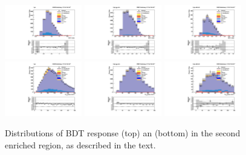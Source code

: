 \begin{figure}[!htpb]\centering
 \captionsetup{justification=centering}
 \includegraphics[width=0.30\textwidth]{plots_and_figures/chapter6/tt_cr_cutbased/1_preselection_BDT_value.pdf}
 \includegraphics[width=0.30\textwidth]{plots_and_figures/chapter6/tt_cr_cutbased/21_preselection_BDT_value.pdf} 
 \includegraphics[width=0.30\textwidth]{plots_and_figures/chapter6/tt_cr_cutbased/22_preselection_BDT_value.pdf} \\
 \includegraphics[width=0.30\textwidth]{plots_and_figures/chapter6/tt_cr_cutbased/1_preselection_h_collmass_pfmet.pdf}
 \includegraphics[width=0.30\textwidth]{plots_and_figures/chapter6/tt_cr_cutbased/21_preselection_h_collmass_pfmet.pdf} 
 \includegraphics[width=0.30\textwidth]{plots_and_figures/chapter6/tt_cr_cutbased/22_preselection_h_collmass_pfmet.pdf} \\


 \caption{Distributions of BDT response (top) an \mcol (bottom) in the second \ttb enriched region, as described in the text.}
 \label{fig:tt_cr_cutbased}
\end{figure}

